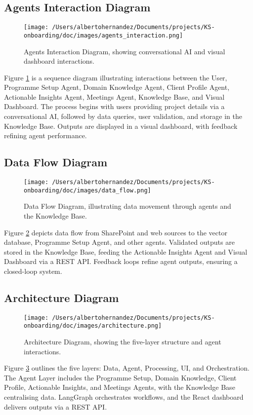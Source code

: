 \documentclass{article}
\begin{document}
\subsection{Agents Interaction Diagram}
\begin{landscape}
\begin{figure}[p]
    \centering
    \texttt{[image: /Users/albertohernandez/Documents/projects/KS-onboarding/doc/images/agents\_interaction.png]}
    \caption{Agents Interaction Diagram, showing conversational AI and visual dashboard interactions.}
    \label{fig:agents_interaction}
\end{figure}
\end{landscape}
Figure \ref{fig:agents_interaction} is a sequence diagram illustrating interactions between the User, Programme Setup Agent, Domain Knowledge Agent, Client Profile Agent, Actionable Insights Agent, Meetings Agent, Knowledge Base, and Visual Dashboard. The process begins with users providing project details via a conversational AI, followed by data queries, user validation, and storage in the Knowledge Base. Outputs are displayed in a visual dashboard, with feedback refining agent performance.

\subsection{Data Flow Diagram}
\begin{figure}[p]
    \centering
    \texttt{[image: /Users/albertohernandez/Documents/projects/KS-onboarding/doc/images/data\_flow.png]}
    \caption{Data Flow Diagram, illustrating data movement through agents and the Knowledge Base.}
    \label{fig:data_flow}
\end{figure}
Figure \ref{fig:data_flow} depicts data flow from SharePoint and web sources to the vector database, Programme Setup Agent, and other agents. Validated outputs are stored in the Knowledge Base, feeding the Actionable Insights Agent and Visual Dashboard via a REST API. Feedback loops refine agent outputs, ensuring a closed-loop system.

\subsection{Architecture Diagram}
\begin{figure}[p]
    \centering
    \texttt{[image: /Users/albertohernandez/Documents/projects/KS-onboarding/doc/images/architecture.png]}
    \caption{Architecture Diagram, showing the five-layer structure and agent interactions.}
    \label{fig:architecture}
\end{figure}
Figure \ref{fig:architecture} outlines the five layers: Data, Agent, Processing, UI, and Orchestration. The Agent Layer includes the Programme Setup, Domain Knowledge, Client Profile, Actionable Insights, and Meetings Agents, with the Knowledge Base centralising data. LangGraph orchestrates workflows, and the React dashboard delivers outputs via a REST API.
\end{document}
